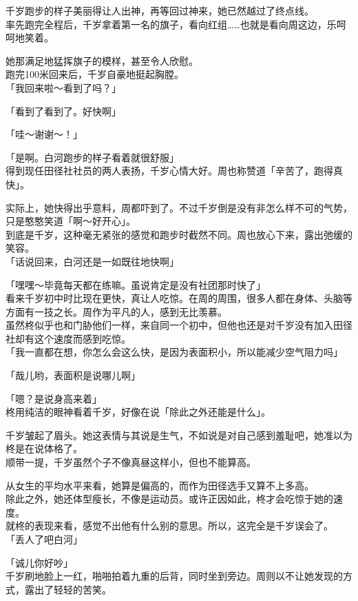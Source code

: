 千岁跑步的样子美丽得让人出神，再等回过神来，她已然越过了终点线。\\

率先跑完全程后，千岁拿着第一名的旗子，看向红组……也就是看向周这边，乐呵呵地笑着。

她那满足地猛挥旗子的模样，甚至令人欣慰。\\

跑完100米回来后，千岁自豪地挺起胸膛。\\

「我回来啦～看到了吗？」

「看到了看到了。好快啊」

「哇～谢谢～！」

「是啊。白河跑步的样子看着就很舒服」\\

得到现任田径社社员的两人表扬，千岁心情大好。周也称赞道「辛苦了，跑得真快」。

实际上，她快得出乎意料，周都吓到了。不过千岁倒是没有非怎么样不可的气势，只是憨憨笑道「啊～好开心」。\\

到底是千岁，这种毫无紧张的感觉和跑步时截然不同。周也放心下来，露出弛缓的笑容。\\

「话说回来，白河还是一如既往地快啊」

「嘿嘿～毕竟每天都在练嘛。虽说肯定是没有社团那时快了」\\

看来千岁初中时比现在更快，真让人吃惊。在周的周围，很多人都在身体、头脑等方面有一技之长。周作为平凡的人，感到无比羡慕。\\

虽然柊似乎也和门胁他们一样，来自同一个初中，但他也还是对千岁没有加入田径社却有这个速度而感到吃惊。\\

「我一直都在想，你怎么会这么快，是因为表面积小，所以能减少空气阻力吗」

「哉儿哟，表面积是说哪儿啊」

「嗯？是说身高来着」\\

柊用纯洁的眼神看着千岁，好像在说「除此之外还能是什么」。

千岁皱起了眉头。她这表情与其说是生气，不如说是对自己感到羞耻吧，她准以为柊是在说体格了。\\

顺带一提，千岁虽然个子不像真昼这样小，但也不能算高。

从女生的平均水平来看，她算是偏高的，而作为田径选手又算不上多高。\\

除此之外，她还体型瘦长，不像是运动员。或许正因如此，柊才会吃惊于她的速度。\\

就柊的表现来看，感觉不出他有什么别的意思。所以，这完全是千岁误会了。\\

「丢人了吧白河」

「诚儿你好吵」\\

千岁刷地脸上一红，啪啪拍着九重的后背，同时坐到旁边。周则以不让她发现的方式，露出了轻轻的苦笑。

